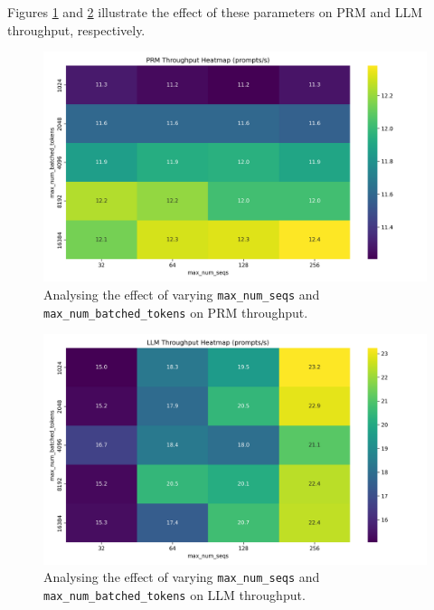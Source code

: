 \documentclass[12pt,twoside]{report}
\begin{document}
Figures \ref{fig:prm_batch_size_tradeoff} and \ref{fig:llm_batch_size_tradeoff} illustrate the effect of these parameters on PRM and LLM throughput, respectively. 



\begin{figure}[htbp]
  \centering
  \includegraphics[width=\textwidth]{figures/prm_batch_size_tradeoff.png}
  \caption{Analysing the effect of varying \texttt{max\_num\_seqs} and \texttt{max\_num\_batched\_tokens} on PRM throughput.}
  \label{fig:prm_batch_size_tradeoff}
\end{figure}

\begin{figure}[htbp]
  \centering
  \includegraphics[width=\textwidth]{figures/llm_batch_size_tradeoff.png}
  \caption{Analysing the effect of varying \texttt{max\_num\_seqs} and \texttt{max\_num\_batched\_tokens} on LLM throughput.}
  \label{fig:llm_batch_size_tradeoff}
\end{figure}
\end{document}
